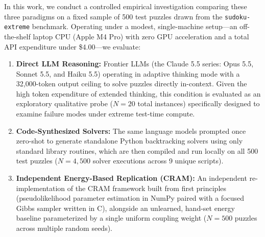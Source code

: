 \documentclass{article} %
\begin{document}
In this work, we conduct a controlled empirical investigation comparing these three paradigms on a fixed sample of 500 test puzzles drawn from the \texttt{sudoku-extreme} benchmark. Operating under a modest, single-machine setup—an off-the-shelf laptop CPU (Apple M4 Pro) with zero GPU acceleration and a total API expenditure under \$4.00—we evaluate:
\begin{enumerate}
    \item \textbf{Direct LLM Reasoning:} Frontier LLMs (the Claude 5.5 series: Opus 5.5, Sonnet 5.5, and Haiku 5.5) operating in adaptive thinking mode with a 32,000-token output ceiling to solve puzzles directly in-context. Given the high token expenditure of extended thinking, this condition is evaluated as an exploratory qualitative probe ($N=20$ total instances) specifically designed to examine failure modes under extreme test-time compute.
    \item \textbf{Code-Synthesized Solvers:} The same language models prompted once zero-shot to generate standalone Python backtracking solvers using only standard library routines, which are then compiled and run locally on all 500 test puzzles ($N=4,500$ solver executions across 9 unique scripts).
    \item \textbf{Independent Energy-Based Replication (CRAM):} An independent re-implementation of the CRAM framework built from first principles (pseudolikelihood parameter estimation in NumPy paired with a focused Gibbs sampler written in C), alongside an unlearned, hand-set energy baseline parameterized by a single uniform coupling weight ($N=500$ puzzles across multiple random seeds).
\end{enumerate}
\end{document}
